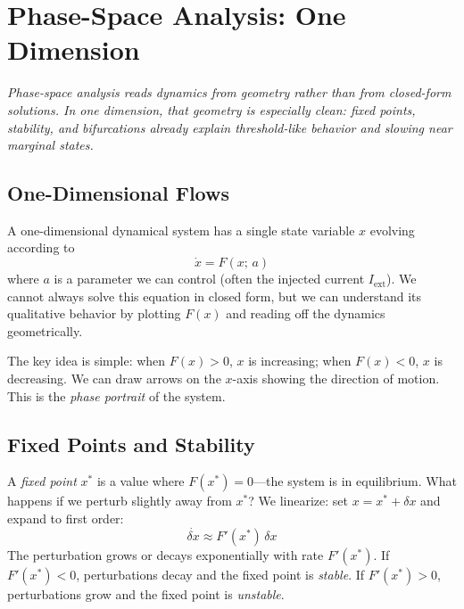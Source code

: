 \chapter{Phase-Space Analysis: One Dimension}
\label{ch:phase-plane-1d}

\textit{Phase-space analysis reads dynamics from geometry rather than from closed-form solutions. In one dimension, that geometry is especially clean: fixed points, stability, and bifurcations already explain threshold-like behavior and slowing near marginal states.}

\section{One-Dimensional Flows}
\label{sec:1d-flows}

A one-dimensional dynamical system has a single state variable $x$ evolving according to
%
\begin{equation}
  \dot{x} = F(x;\, a)
  \label{eq:1d-flow}
\end{equation}
%
where $a$ is a parameter we can control (often the injected current $I_{\text{ext}}$). We cannot always solve this equation in closed form, but we can understand its qualitative behavior by plotting $F(x)$ and reading off the dynamics geometrically.

The key idea is simple: when $F(x) > 0$, $x$ is increasing; when $F(x) < 0$, $x$ is decreasing. We can draw arrows on the $x$-axis showing the direction of motion. This is the \emph{phase portrait} of the system.

\section{Fixed Points and Stability}
\label{sec:fixed-points-1d}

A \emph{fixed point} $x^*$ is a value where $F(x^*) = 0$---the system is in equilibrium. What happens if we perturb slightly away from $x^*$? We linearize: set $x = x^* + \delta x$ and expand to first order:
%
\begin{equation}
  \dot{\delta x} \approx F'(x^*)\,\delta x
  \label{eq:1d-linearization}
\end{equation}
%
The perturbation grows or decays exponentially with rate $F'(x^*)$. If $F'(x^*) < 0$, perturbations decay and the fixed point is \emph{stable}. If $F'(x^*) > 0$, perturbations grow and the fixed point is \emph{unstable}.

